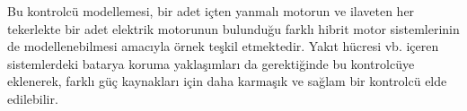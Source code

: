 Bu kontrolcü modellemesi, bir adet içten yanmalı motorun ve ilaveten her tekerlekte bir adet elektrik motorunun bulunduğu farklı hibrit motor sistemlerinin de 
modellenebilmesi amacıyla örnek teşkil etmektedir. Yakıt hücresi vb. içeren sistemlerdeki batarya koruma yaklaşımları da gerektiğinde bu kontrolcüye eklenerek, farklı güç kaynakları için 
daha karmaşık ve sağlam bir kontrolcü elde edilebilir.  

